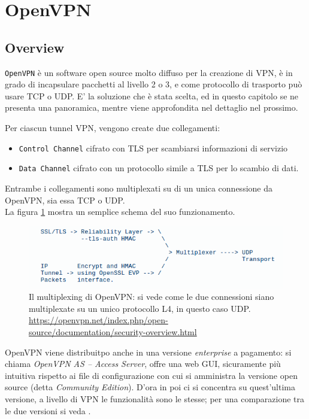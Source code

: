 \section{OpenVPN}
\subsection{Overview}
\texttt{OpenVPN} \cite{openvpn} è un software open source molto diffuso per la creazione di VPN,
è in grado di incapsulare pacchetti al livello 2 o 3, e come protocollo di trasporto
può usare TCP o UDP. E' la soluzione che è stata scelta, ed in questo capitolo
se ne presenta una panoramica, mentre viene approfondita nel dettaglio
nel prossimo.

Per ciascun tunnel VPN, vengono create due collegamenti:
\begin{itemize}
	\item \texttt{Control Channel} cifrato con TLS per scambiarsi informazioni di servizio
	\item \texttt{Data Channel} cifrato con un protocollo simile a TLS per lo scambio
	      di dati.
\end{itemize}
Entrambe i collegamenti sono multiplexati su di un unica connessione
da OpenVPN, sia essa TCP o UDP\cite{openvpn-security}.\\
La figura \ref{fig:openvpn-sec} mostra un semplice schema del suo funzionamento.\\
\begin{figure}[h!]
	\includegraphics[scale=0.4]{img/openvpn_sec}
	\caption[Il multiplexing di OpenVPN]{Il multiplexing di OpenVPN: si vede come
		le due connessioni siano multiplexate su un unico protocollo L4, in questo caso UDP.
		\url{https://openvpn.net/index.php/open-source/documentation/security-overview.html}}
	\label{fig:openvpn-sec}
\end{figure}
OpenVPN viene distribuitpo anche in una versione \textit{enterprise} a pagamento: si chiama
\textit{OpenVPN AS -- Access Server}, offre una web GUI, sicuramente più intuitiva
rispetto ai file di configurazione con cui si amministra la versione open source
(detta \textit{Community Edition})\cite{openvpn-intro}. D'ora in poi ci si concentra su quest'ultima
versione, a livello di VPN le funzionalità sono le stesse; per una comparazione tra
le due versioni si veda
\cite{openvpn-comparison}.

